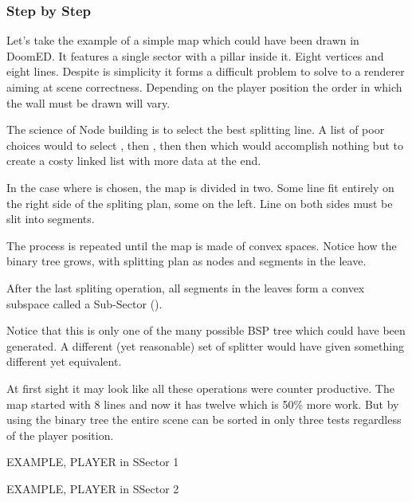 \par
\subsubsection{Step by Step}
Let's take the example of a simple map which could have been drawn in DoomED. It features a single sector with a pillar inside it. Eight vertices and eight lines. Despite is simplicity it forms a difficult problem to solve to a renderer aiming at scene correctness. Depending on the player position the order in which the wall must be drawn will vary. \\
\par
{}
\par
The science of Node building is to select the best splitting line. A list of poor choices would to select , then , then  then  which would accomplish nothing but to create a costy linked list with more data at the end.\\ 
\par
In the case where  is chosen, the map is divided in two. Some line fit entirely on the right side of the spliting plan, some on the left. Line on both sides must be slit into segments.\\
\par
{}
\par
The process is repeated until the map is made of convex spaces. Notice how the binary tree grows, with splitting plan as nodes and segments in the leave. 
\par
{}
\par
After the last spliting operation, all segments in the leaves form a convex subspace called a Sub-Sector ().\\
\par
{}
\par
Notice that this is only one of the many possible BSP tree which could have been generated. A different (yet reasonable) set of splitter would have given something different yet equivalent.\\
\par
{}
\par
At first sight it may look like all these operations were counter productive. The map started with 8 lines and now it has twelve which is 50\% more work. But by using the binary tree the entire scene can be sorted in only three tests regardless of the player position.
\par
EXAMPLE, PLAYER in SSector 1\\
\par
EXAMPLE, PLAYER in SSector 2\\





